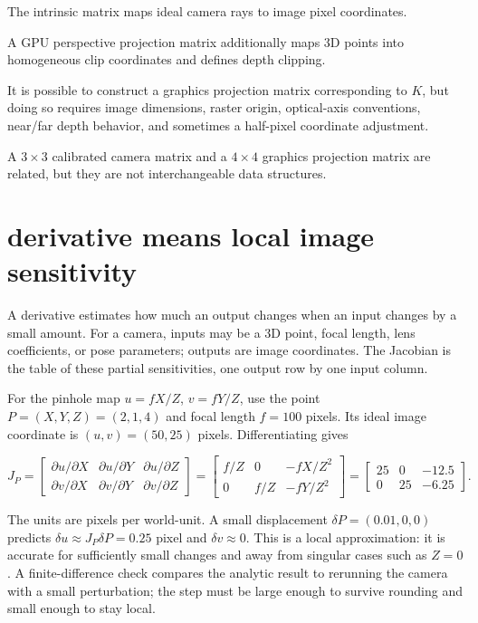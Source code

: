 The intrinsic matrix maps ideal camera rays to image pixel coordinates.

A GPU perspective projection matrix additionally maps 3D points into homogeneous clip coordinates and defines depth clipping.

It is possible to construct a graphics projection matrix corresponding to \(K\), but doing so requires image dimensions, raster origin, optical-axis conventions, near/far depth behavior, and sometimes a half-pixel coordinate adjustment.

A \(3\times3\) calibrated camera matrix and a \(4\times4\) graphics projection matrix are related, but they are not interchangeable data structures.

\section{derivative means local image sensitivity}\label{02-foundations-ii-ch034-derivative-means-local-image-sensitivity}

A derivative estimates how much an output changes when an input changes by a small amount. For a camera, inputs may be a 3D point, focal length, lens coefficients, or pose parameters; outputs are image coordinates. The Jacobian is the table of these partial sensitivities, one output row by one input column.

For the pinhole map \(u=fX/Z\), \(v=fY/Z\), use the point \(P=(X,Y,Z)=(2,1,4)\) and focal length \(f=100\) pixels. Its ideal image coordinate is \((u,v)=(50,25)\) pixels. Differentiating gives

\[
J_P=\begin{bmatrix}
\partial u/\partial X&\partial u/\partial Y&\partial u/\partial Z\\
\partial v/\partial X&\partial v/\partial Y&\partial v/\partial Z
\end{bmatrix}
=\begin{bmatrix}f/Z&0&-fX/Z^2\\0&f/Z&-fY/Z^2\end{bmatrix}
=\begin{bmatrix}25&0&-12.5\\0&25&-6.25\end{bmatrix}.
\]

The units are pixels per world-unit. A small displacement \(\delta P=(0.01,0,0)\) predicts \(\delta u\approx J_P\delta P=0.25\) pixel and \(\delta v\approx0\). This is a local approximation: it is accurate for sufficiently small changes and away from singular cases such as \(Z=0\). A finite-difference check compares the analytic result to rerunning the camera with a small perturbation; the step must be large enough to survive rounding and small enough to stay local.

